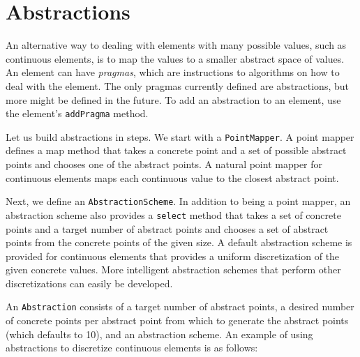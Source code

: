 \section{Abstractions}

An alternative way to dealing with elements with many possible values, such as continuous elements, is to map the values to a smaller abstract space of values. An element can have \emph{pragmas}, which are instructions to algorithms on how to deal with the element. The only pragmas currently defined are abstractions, but more might be defined in the future. To add an abstraction to an element, use the element's \texttt{addPragma} method.

Let us build abstractions in steps. We start with a \texttt{PointMapper}. A point mapper defines a map method that takes a concrete point and a set of possible abstract points and chooses one of the abstract points. A natural point mapper for continuous elements maps each continuous value to the closest abstract point.

Next, we define an \texttt{AbstractionScheme}. In addition to being a point mapper, an abstraction scheme also provides a \texttt{select} method that takes a set of concrete points and a target number of abstract points and chooses a set of abstract points from the concrete points of the given size. A default abstraction scheme is provided for continuous elements that provides a uniform discretization of the given concrete values. More intelligent abstraction schemes that perform other discretizations can easily be developed.

An \texttt{Abstraction} consists of a target number of abstract points, a desired number of concrete points per abstract point from which to generate the abstract points (which defaults to 10), and an abstraction scheme. An example of using abstractions to discretize continuous elements is as follows:

